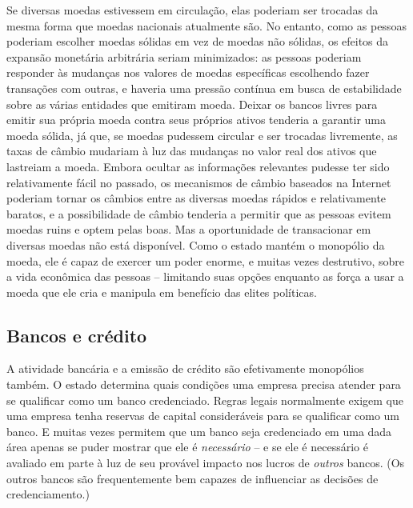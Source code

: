 Se diversas moedas estivessem em circulação, elas poderiam ser trocadas da mesma forma que moedas nacionais atualmente são. No entanto, como as pessoas poderiam escolher moedas sólidas em vez de moedas não sólidas, os efeitos da expansão monetária arbitrária seriam minimizados: as pessoas poderiam responder às mudanças nos valores de moedas específicas escolhendo fazer transações com outras, e haveria uma pressão contínua em busca de estabilidade sobre as várias entidades que emitiram moeda. Deixar os bancos livres para emitir sua própria moeda contra seus próprios ativos tenderia a garantir uma moeda sólida, já que, se moedas pudessem circular e ser trocadas livremente, as taxas de câmbio mudariam à luz das mudanças no valor real dos ativos que lastreiam a moeda. Embora ocultar as informações relevantes pudesse ter sido relativamente fácil no passado, os mecanismos de câmbio baseados na Internet poderiam tornar os câmbios entre as diversas moedas rápidos e relativamente baratos, e a possibilidade de câmbio tenderia a permitir que as pessoas evitem moedas ruins e optem pelas boas. Mas a oportunidade de transacionar em diversas moedas não está disponível. Como o estado mantém o monopólio da moeda, ele é capaz de exercer um poder enorme, e muitas vezes destrutivo, sobre a vida econômica das pessoas -- limitando suas opções enquanto as força a usar a moeda que ele cria e manipula em benefício das elites políticas.

\subsection*{Bancos e crédito}

A atividade bancária e a emissão de crédito são efetivamente monopólios também. O estado determina quais condições uma empresa precisa atender para se qualificar como um banco credenciado. Regras legais normalmente exigem que uma empresa tenha reservas de capital consideráveis para se qualificar como um banco. E muitas vezes permitem que um banco seja credenciado em uma dada área apenas se puder mostrar que ele é \emph{necessário} -- e se ele é necessário é avaliado em parte à luz de seu provável impacto nos lucros de \emph{outros} bancos. (Os outros bancos são frequentemente bem capazes de influenciar as decisões de credenciamento.)

